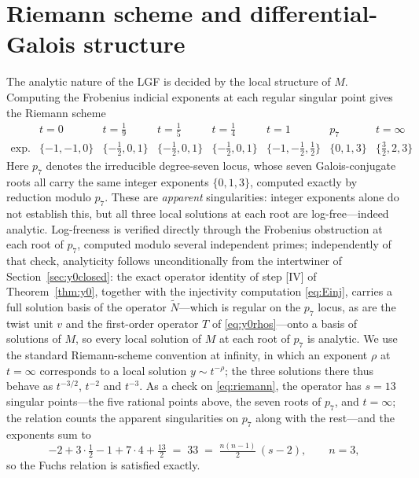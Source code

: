 \documentclass[cntp]{ipart}
\theoremstyle{plain}
\theoremstyle{remark}
\begin{document}
\section{Riemann scheme and differential-Galois structure}
The analytic nature of the LGF is decided by the local structure of $M$. Computing the Frobenius indicial
exponents at each regular singular point gives the Riemann scheme
{\small\setlength{\arraycolsep}{3pt}%
\begin{equation}
\begin{array}{c|ccccccc}
 & t=0 & t=\tfrac19 & t=\tfrac15 & t=\tfrac14 & t=1 & p_7 & t=\infty \\\hline
\text{exp.} & \{-1,-1,0\} & \{-\tfrac12,0,1\} & \{-\tfrac12,0,1\} & \{-\tfrac12,0,1\}
 & \{-1,-\tfrac12,\tfrac12\} & \{0,1,3\} & \{\tfrac32,2,3\}
\end{array}
\label{eq:riemann}
\end{equation}}
Here $p_7$ denotes the irreducible degree-seven locus, whose seven Galois-conjugate roots all carry the same
integer exponents $\{0,1,3\}$, computed exactly by reduction modulo $p_7$. These are \emph{apparent}
singularities: integer exponents alone do not establish this, but all three local solutions at each root are
log-free---indeed analytic. Log-freeness is verified directly through the Frobenius obstruction at each root of
$p_7$, computed modulo several independent primes; independently of that check, analyticity follows
unconditionally from the intertwiner of Section~\ref{sec:y0closed}: the exact operator identity of step [IV] of
Theorem~\ref{thm:y0}, together with the injectivity computation \eqref{eq:Einj}, carries a full solution basis of
the operator $\widetilde N$---which is regular on the $p_7$ locus, as are the twist unit $v$ and the first-order
operator $T$ of \eqref{eq:y0rhos}---onto a basis of solutions of $M$, so every local solution of $M$ at each root
of $p_7$ is analytic. We use the standard
Riemann-scheme convention at infinity, in which an exponent $\rho$ at $t=\infty$ corresponds to a local solution
$y\sim t^{-\rho}$; the three solutions there thus behave as $t^{-3/2}$, $t^{-2}$ and $t^{-3}$. As a check on
\eqref{eq:riemann}, the operator has $s=13$ singular points---the five rational points above, the seven roots of
$p_7$, and $t=\infty$; the relation counts the apparent singularities on $p_7$ along with the rest---and the
exponents sum to
\begin{equation}
-2 + 3\cdot\tfrac12 - 1 + 7\cdot 4 + \tfrac{13}{2} \;=\; 33 \;=\; \tfrac{n(n-1)}{2}\,(s-2),\qquad n=3,
\end{equation}
so the Fuchs relation is satisfied exactly.
\end{document}
